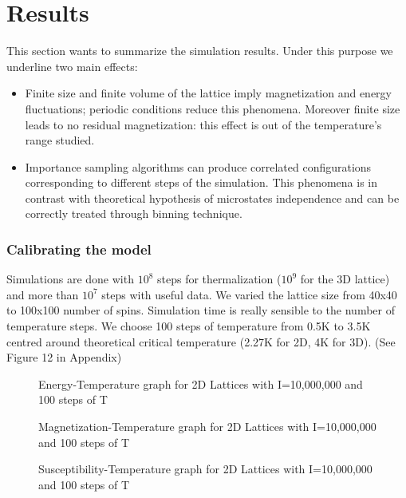 \documentclass[11pt,a4paper]{article}
\begin{document}
\section{Results}
This section wants to summarize the simulation results. Under this purpose we underline two main effects:

\begin{itemize}
\item Finite size and finite volume of the lattice imply magnetization and energy fluctuations; periodic conditions reduce this phenomena. Moreover finite size leads to no residual magnetization: this effect is out of the temperature's range studied.

\item Importance sampling algorithms can produce correlated configurations corresponding to different steps of the simulation. This phenomena is in contrast with theoretical hypothesis of microstates independence and can be correctly treated through binning technique. 
\end{itemize}

\subsubsection*{Calibrating the model}
Simulations are done with $10^8$ steps for thermalization ($10^9$ for the 3D lattice) and more than $10^7$ steps with useful data. We varied the lattice size from 40x40 to 100x100 number of spins. Simulation time is really sensible to the number of temperature steps. We choose 100 steps of temperature from 0.5K to 3.5K centred around theoretical critical temperature (2.27K for 2D, 4K for 3D). (See Figure 12 in Appendix) 

\begin{figure}[h!]
  \centering
  
  \caption{Energy-Temperature graph for 2D Lattices with I=10,000,000 and 100 steps of T}
\end{figure}

\begin{figure}[h!]
  \centering

  \caption{Magnetization-Temperature graph for 2D Lattices with I=10,000,000 and 100 steps of T}
\end{figure}

\begin{figure}[h!]
  \centering
 
  \caption{Susceptibility-Temperature graph for 2D Lattices with I=10,000,000 and 100 steps of T}
\end{figure}
\end{document}
